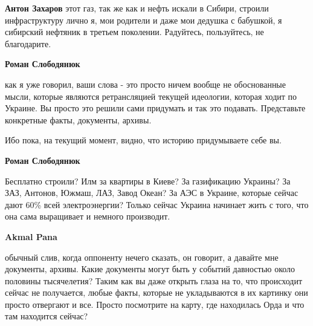 \begin{itemize}
\begin{itemize}
\textbf{Антон Захаров} этот газ, так же как и нефть искали в Сибири, строили инфраструктуру лично я, мои родители и даже мои дедушка с бабушкой, я сибирский нефтяник в третьем поколении. Радуйтесь, пользуйтесь, не благодарите.

 
\textbf{Роман Слободянюк} 

как я уже говорил, ваши слова - это просто ничем вообще не обоснованные мысли,
которые являются ретрансляцией текущей идеологии, которая ходит по Украине. Вы
просто это решили сами придумать и так это подавать. Представьте конкретные
факты, документы, архивы.

Ибо пока, на текущий момент, видно, что историю придумываете себе вы.

 
\textbf{Роман Слободянюк} 

Бесплатно строили? Илм за квартиры в Киеве? За газификацию Украины? За ЗАЗ,
Антонов, Южмаш, ЛАЗ, Завод Океан? За АЭС в Украине, которые сейчас дают 60\%
всей электроэнергии? Только сейчас Украина начинает жить с того, что она сама
выращивает и немного производит.


 
\textbf{Akmal Pana} 

обычный слив, когда оппоненту нечего сказать, он говорит, а давайте мне
документы, архивы. Какие документы могут быть у событий давностью около
половины тысячелетия? Таким как вы даже открыть глаза на то, что происходит
сейчас не получается, любые факты, которые не укладываются в их картинку они
просто отвергают и все. Просто посмотрите на карту, где находилась Орда и что
там находится сейчас?

 

\end{itemize}
\end{itemize}
